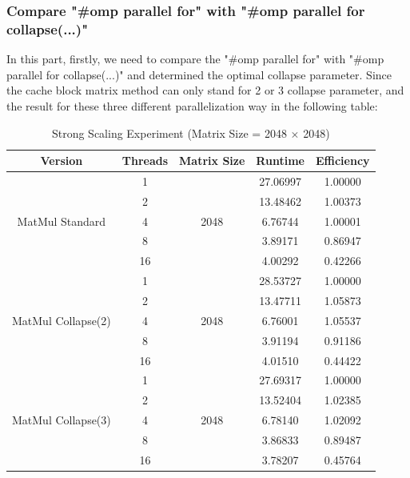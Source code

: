 \documentclass[11pt]{article}
\begin{document}
\subsubsection{Compare "\#omp parallel for" with "\#omp parallel for collapse(...)"}
In this part, firstly, we need to compare the "\#omp parallel for" with "\#omp parallel for collapse(...)" and determined the optimal collapse parameter. Since the cache block matrix method can only stand for 2 or 3 collapse parameter, and the result for these three different parallelization way in the following table:
\begin{table}[H]
\centering
\begin{tabular}{|c|c|c|c|c|}
\hline
\textbf{Version} & \textbf{Threads} & \textbf{Matrix Size} & \textbf{Runtime} & \textbf{Efficiency} \\ \hline
\multirow{5}{*}{MatMul Standard} 
& 1  & \multirow{5}{*}{2048} & 27.06997 & 1.00000 \\ \cline{2-2} \cline{4-5}
& 2  & & 13.48462 & 1.00373 \\ \cline{2-2} \cline{4-5}
& 4  & & 6.76744  & 1.00001 \\ \cline{2-2} \cline{4-5}
& 8  & & 3.89171  & 0.86947 \\ \cline{2-2} \cline{4-5}
& 16 & & 4.00292  & 0.42266 \\ \hline
\multirow{5}{*}{MatMul Collapse(2)} 
& 1  & \multirow{5}{*}{2048} & 28.53727 & 1.00000 \\ \cline{2-2} \cline{4-5}
& 2  & & 13.47711 & 1.05873 \\ \cline{2-2} \cline{4-5}
& 4  & & 6.76001  & 1.05537 \\ \cline{2-2} \cline{4-5}
& 8  & & 3.91194  & 0.91186 \\ \cline{2-2} \cline{4-5}
& 16 & & 4.01510  & 0.44422 \\ \hline
\multirow{5}{*}{MatMul Collapse(3)} 
& 1  & \multirow{5}{*}{2048} & 27.69317 & 1.00000 \\ \cline{2-2} \cline{4-5}
& 2  & & 13.52404 & 1.02385 \\ \cline{2-2} \cline{4-5}
& 4  & & 6.78140  & 1.02092 \\ \cline{2-2} \cline{4-5}
& 8  & & 3.86833  & 0.89487 \\ \cline{2-2} \cline{4-5}
& 16 & & 3.78207  & 0.45764 \\ \hline
\end{tabular}
\caption{Strong Scaling Experiment (Matrix Size = 2048 $\times$ 2048)}
\label{tab:matmul_scaling}
\end{table}
\end{document}

